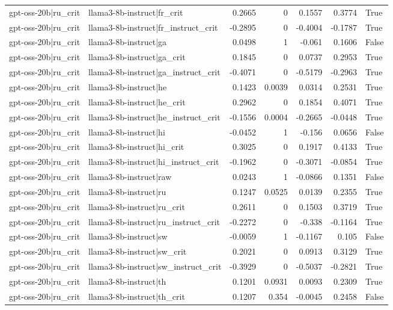 \begin{table}
\begin{tabular}{l l r r r r l}
gpt-oss-20b|ru_crit & llama3-8b-instruct|fr_crit & 0.2665 & 0 & 0.1557 & 0.3774 & True \\
gpt-oss-20b|ru_crit & llama3-8b-instruct|fr_instruct_crit & -0.2895 & 0 & -0.4004 & -0.1787 & True \\
gpt-oss-20b|ru_crit & llama3-8b-instruct|ga & 0.0498 & 1 & -0.061 & 0.1606 & False \\
gpt-oss-20b|ru_crit & llama3-8b-instruct|ga_crit & 0.1845 & 0 & 0.0737 & 0.2953 & True \\
gpt-oss-20b|ru_crit & llama3-8b-instruct|ga_instruct_crit & -0.4071 & 0 & -0.5179 & -0.2963 & True \\
gpt-oss-20b|ru_crit & llama3-8b-instruct|he & 0.1423 & 0.0039 & 0.0314 & 0.2531 & True \\
gpt-oss-20b|ru_crit & llama3-8b-instruct|he_crit & 0.2962 & 0 & 0.1854 & 0.4071 & True \\
gpt-oss-20b|ru_crit & llama3-8b-instruct|he_instruct_crit & -0.1556 & 0.0004 & -0.2665 & -0.0448 & True \\
gpt-oss-20b|ru_crit & llama3-8b-instruct|hi & -0.0452 & 1 & -0.156 & 0.0656 & False \\
gpt-oss-20b|ru_crit & llama3-8b-instruct|hi_crit & 0.3025 & 0 & 0.1917 & 0.4133 & True \\
gpt-oss-20b|ru_crit & llama3-8b-instruct|hi_instruct_crit & -0.1962 & 0 & -0.3071 & -0.0854 & True \\
gpt-oss-20b|ru_crit & llama3-8b-instruct|raw & 0.0243 & 1 & -0.0866 & 0.1351 & False \\
gpt-oss-20b|ru_crit & llama3-8b-instruct|ru & 0.1247 & 0.0525 & 0.0139 & 0.2355 & True \\
gpt-oss-20b|ru_crit & llama3-8b-instruct|ru_crit & 0.2611 & 0 & 0.1503 & 0.3719 & True \\
gpt-oss-20b|ru_crit & llama3-8b-instruct|ru_instruct_crit & -0.2272 & 0 & -0.338 & -0.1164 & True \\
gpt-oss-20b|ru_crit & llama3-8b-instruct|sw & -0.0059 & 1 & -0.1167 & 0.105 & False \\
gpt-oss-20b|ru_crit & llama3-8b-instruct|sw_crit & 0.2021 & 0 & 0.0913 & 0.3129 & True \\
gpt-oss-20b|ru_crit & llama3-8b-instruct|sw_instruct_crit & -0.3929 & 0 & -0.5037 & -0.2821 & True \\
gpt-oss-20b|ru_crit & llama3-8b-instruct|th & 0.1201 & 0.0931 & 0.0093 & 0.2309 & True \\
gpt-oss-20b|ru_crit & llama3-8b-instruct|th_crit & 0.1207 & 0.354 & -0.0045 & 0.2458 & False \\

\end{tabular}
\end{table}
